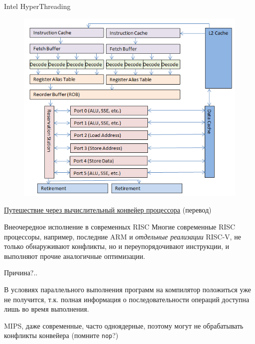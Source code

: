 \documentclass[xetex,aspectratio=43]{beamer}
\begin{document}
\begin{frame}{Intel HyperThreading}
    \begin{figure}
        \includegraphics[height=0.8\textheight]{img/11.Intel_HT.png}
    \end{figure}

    \href{https://habr.com/ru/post/182002/}{Путешествие через вычислительный конвейер процессора} (перевод)
\end{frame}

\begin{frame}{Внеочередное исполнение в современных RISC}
    Многие современные RISC процессоры, например, последние ARM и \emph{отдельные реализации} RISC-V, не только     обнаруживают конфликты, но и переупорядочивают инструкции, и выполняют
    прочие аналогичные оптимизации.

    Причина?..

    \pause

    В условиях параллельного выполнения программ на компилятор положиться
    уже не получится, т.к. полная информация о последовательности операций
    доступна лишь во время выполнения.

    MIPS, даже современные, часто одноядерные, поэтому могут не обрабатывать конфликты конвейера (помните \texttt{nop}?)
\end{frame}
\end{document}
